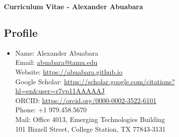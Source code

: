 \documentclass[11pt,oneside]{article}
\begin{document}
\pagestyle{firstpage}
\raggedright

\centerline{\Large \textbf{Curriculum Vitae - Alexander Abuabara}}

\vspace{12pt}

\setcounter{section}{1}

\subsection{Profile}
\begin{itemize}[leftmargin=40pt, label={}]
\item Name: Alexander Abuabara\\
      Email: \href{abuabara@tamu.edu}{abuabara@tamu.edu}\\
      Website: \url{https://abuabara.github.io}\\
      Google Scholar: \url{https://scholar.google.com/citations?hl=en&user=r7vp11AAAAAJ}\\
      ORCID: \url{https://orcid.org/0000-0002-3522-6101}\\
      Phone: +1 979.458.5670\\
      Mail: Office 4013, Emerging Technologies Building\\
            \hspace{0.85cm} 101 Bizzell Street, College Station, TX 77843-3131\\
\end{itemize}
\end{document}
